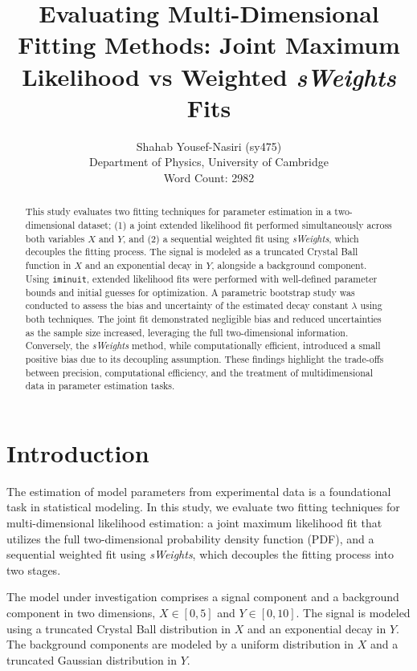 \documentclass[11pt, a4paper]{article}
\title{\textbf{Evaluating Multi-Dimensional Fitting Methods: Joint Maximum Likelihood vs Weighted \textit{sWeights} Fits}}
\author{
    Shahab Yousef-Nasiri (sy475) \\
    \small Department of Physics, University of Cambridge \\
    \small Word Count: 2982
}
\date{}
\begin{document}
\maketitle

\begin{abstract}
This study evaluates two fitting techniques for parameter estimation in a two-dimensional dataset; (1) a joint extended likelihood fit performed simultaneously across both variables \( X \) and \( Y \), and (2) a sequential weighted fit using \textit{sWeights}, which decouples the fitting process. The signal is modeled as a truncated Crystal Ball function in \( X \) and an exponential decay in \( Y \), alongside a background component. Using \texttt{iminuit}, extended likelihood fits were performed with well-defined parameter bounds and initial guesses for optimization. A parametric bootstrap study was conducted to assess the bias and uncertainty of the estimated decay constant \( \lambda \) using both techniques. The joint fit demonstrated negligible bias and reduced uncertainties as the sample size increased, leveraging the full two-dimensional information. Conversely, the \textit{sWeights} method, while computationally efficient, introduced a small positive bias due to its decoupling assumption. These findings highlight the trade-offs between precision, computational efficiency, and the treatment of multidimensional data in parameter estimation tasks.  
\end{abstract}

\newpage
\tableofcontents
\newpage
\section{Introduction}

The estimation of model parameters from experimental data is a foundational task in statistical modeling. In this study, we evaluate two fitting techniques for multi-dimensional likelihood estimation: a joint maximum likelihood fit that utilizes the full two-dimensional probability density function (PDF), and a sequential weighted fit using \textit{sWeights}, which decouples the fitting process into two stages. 

The model under investigation comprises a signal component and a background component in two dimensions, \( X \in [0, 5] \) and \( Y \in [0, 10] \). The signal is modeled using a truncated Crystal Ball distribution in \( X \) and an exponential decay in \( Y \). The background components are modeled by a uniform distribution in \( X \) and a truncated Gaussian distribution in \( Y \).
\end{document}
